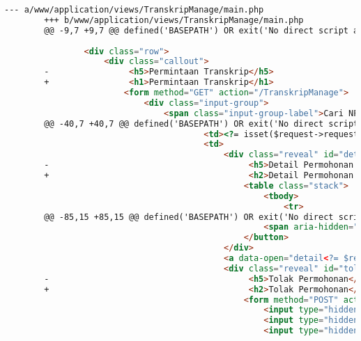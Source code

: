 \begin{itemize}
\begin{lstlisting}[frame=single, label={lst:perbaikan_1.3.1_tag_heading}, language=HTML, caption=Perbaikan Kriteria Sukses 1.3.1 - Penggunaan \textit{Heading} Tidak Tepat]
        --- a/www/application/views/TranskripManage/main.php
        +++ b/www/application/views/TranskripManage/main.php
        @@ -9,7 +9,7 @@ defined('BASEPATH') OR exit('No direct script access allowed');
        
                <div class="row">
                    <div class="callout">
        -                <h5>Permintaan Transkrip</h5>
        +                <h1>Permintaan Transkrip</h1>
                        <form method="GET" action="/TranskripManage">
                            <div class="input-group">
                                <span class="input-group-label">Cari NPM:</span>
        @@ -40,7 +40,7 @@ defined('BASEPATH') OR exit('No direct script access allowed');
                                        <td><?= isset($request->requestByNPM) ? $request->requestByNPM : '-' ?></td>
                                        <td>
                                            <div class="reveal" id="detail<?= $request->id ?>" data-reveal>
        -                                        <h5>Detail Permohonan #<?= $request->id ?></h5>
        +                                        <h2>Detail Permohonan #<?= $request->id ?></h2>
                                                <table class="stack">
                                                    <tbody>
                                                        <tr>                                                     
        @@ -85,15 +85,15 @@ defined('BASEPATH') OR exit('No direct script access allowed');
                                                    <span aria-hidden="true">&times;</span>
                                                </button>                                        
                                            </div>
                                            <a data-open="detail<?= $request->id ?>"><i class="fi-eye"></i></a>
                                            <div class="reveal" id="tolak<?= $request->id ?>" data-reveal>
        -                                        <h5>Tolak Permohonan</h5>
        +                                        <h2>Tolak Permohonan</h2>
                                                <form method="POST" action="/TranskripManage/answer">
                                                    <input type="hidden" name="<?= $this->security->get_csrf_token_name() ?>" value="<?= $this->security->get_csrf_hash() ?>" />
                                                    <input type="hidden" name="id" value="<?= $request->id ?>"/>
                                                    <input type="hidden" name="answer" value="rejected"/>

\end{lstlisting}
\end{itemize}
